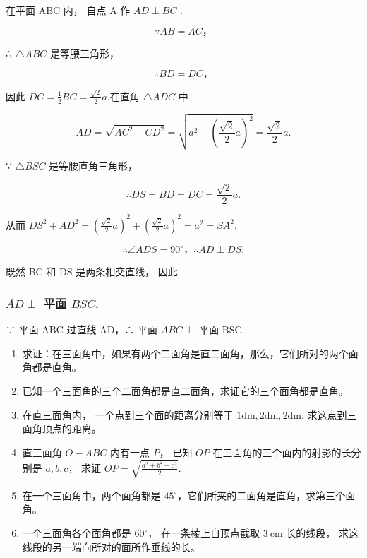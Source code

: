 在平面 ABC 内， 自点 A 作 \(AD \perp BC\) .

\[
\because A B = A C\text{，}
\]

∴ \(\triangle ABC\) 是等腰三角形，

\[
\therefore B D = D C\text{，}
\]

因此 \(DC = \frac{1}{2} BC = \frac{\sqrt{2}}{2} a.\)在直角
\(\triangle ADC\) 中

\[
A D = \sqrt {A C ^ {2} - C D ^ {2}} = \sqrt {a ^ {2} - \left(\frac {\sqrt {2}}{2} a\right) ^ {2}} = \frac {\sqrt {2}}{2} a.
\]

∵ \(\triangle BSC\) 是等腰直角三角形，

\[
\therefore D S = B D = D C = \frac {\sqrt {2}}{2} a.
\]

从而
\(DS^2 + AD^2 = \left(\frac{\sqrt{2}}{2} a\right)^2 + \left(\frac{\sqrt{2}}{2} a\right)^2 = a^2 = SA^2,\)

\[
\therefore \angle A D S = 90^{\circ}\text{，} \therefore A D \perp D S.
\]

既然 BC 和 DS 是两条相交直线， 因此

\subsubsection{\texorpdfstring{\(AD \perp\) 平面
\(BSC\).}{AD \textbackslash perp 平面 BSC.}}\label{ad-perp-ux5e73ux9762-bsc.}

∵ 平面 ABC 过直线 AD，∴ 平面 \(ABC \perp\) 平面 BSC.

\begin{enumerate}
\item
  求证：在三面角中，如果有两个二面角是直二面角，那么，它们所对的两个面角都是直角。
\item
  已知一个三面角的三个二面角都是直二面角，求证它的三个面角都是直角。
\item
  在直三面角内， 一个点到三个面的距离分别等于
  \(1 \mathrm{dm}, 2 \mathrm{dm}, 2 \mathrm{dm}\).
  求这点到三面角顶点的距离。
\item
  直三面角 \(O - ABC\) 内有一点 \(P\)， 已知 \(OP\)
  在三面角的三个面内的射影的长分别是 \(a, b, c\)， 求证
  \(OP = \sqrt{\frac{a^2 + b^2 + c^2}{2}}\).
\item
  在一个三面角中，两个面角都是
  \(45^{\circ}\)，它们所夹的二面角是直角，求第三个面角。
\item
  一个三面角各个面角都是 \(60^{\circ}\)， 在一条棱上自顶点截取
  \(3 \mathrm{~cm}\) 长的线段， 求这线段的另一端向所对的面所作垂线的长。
\end{enumerate}

